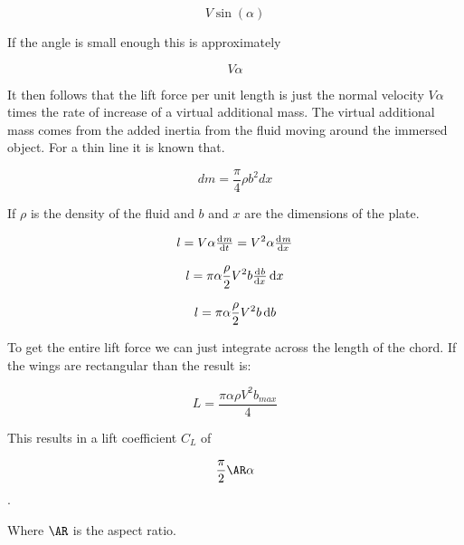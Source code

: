 \[V\sin(\alpha)\]

If the angle is small enough this is approximately

\[V\alpha\]


It then follows that the lift force per unit length is just the normal velocity $V\alpha$ times the
rate of increase of a virtual additional mass. The virtual additional mass comes from the
added inertia from the fluid moving around the immersed object. For a thin line it is known
that.

\[dm=\frac{\pi}{4}\rho b^2 dx\]

If $\rho$ is the density of the fluid and $b$ and $x$ are the dimensions of the plate.

\[l = V\alpha \od{m}{t} = V^2\alpha \od{m}{x} \]

\[l = \pi \alpha \frac{\rho}{2}V^2 b \od{b}{x} \dif{x} \]

\[l = \pi \alpha \frac{\rho}{2} V^2 b \dif{b} \]

To get the entire lift force we can just integrate across the length of the chord. 
If the wings are rectangular than the result is:

\[L = \frac{\pi \alpha \rho V^2 b_{max}}{4} \]

This results in a lift coefficient $C_L$ of

\[ \frac{\pi}{2} \AR \alpha \].

Where $\AR$ is the aspect ratio.




